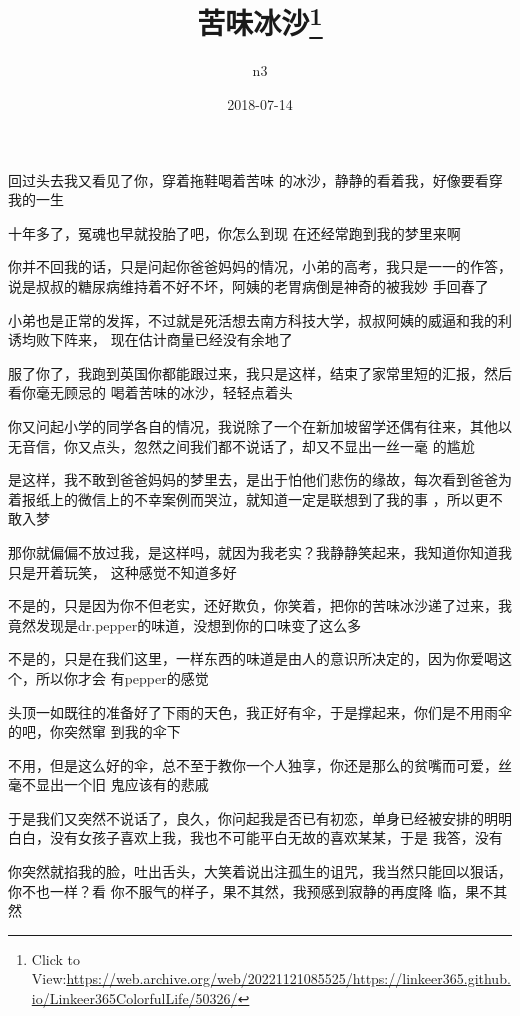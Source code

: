 \documentclass{article}
\title{苦味冰沙\footnote{Click to View:\url{https://web.archive.org/web/20221121085525/https://linkeer365.github.io/Linkeer365ColorfulLife/50326/}}}
\author{n3}
\date{2018-07-14}
\begin{document}

\maketitle


\Large

﻿回过头去我又看见了你，穿着拖鞋喝着苦味
的冰沙，静静的看着我，好像要看穿我的一生 

十年多了，冤魂也早就投胎了吧，你怎么到现
在还经常跑到我的梦里来啊 

你并不回我的话，只是问起你爸爸妈妈的情况，小弟的高考，我只是一一的作答，说是叔叔的糖尿病维持着不好不坏，阿姨的老胃病倒是神奇的被我妙
手回春了 

小弟也是正常的发挥，不过就是死活想去南方科技大学，叔叔阿姨的威逼和我的利诱均败下阵来，
现在估计商量已经没有余地了 

\newpage

服了你了，我跑到英国你都能跟过来，我只是这样，结束了家常里短的汇报，然后看你毫无顾忌的
喝着苦味的冰沙，轻轻点着头 

你又问起小学的同学各自的情况，我说除了一个在新加坡留学还偶有往来，其他以无音信，你又点头，忽然之间我们都不说话了，却又不显出一丝一毫
的尴尬 

是这样，我不敢到爸爸妈妈的梦里去，是出于怕他们悲伤的缘故，每次看到爸爸为着报纸上的微信上的不幸案例而哭泣，就知道一定是联想到了我的事
，所以更不敢入梦 

那你就偏偏不放过我，是这样吗，就因为我老实？我静静笑起来，我知道你知道我只是开着玩笑，
这种感觉不知道多好 

不是的，只是因为你不但老实，还好欺负，你笑着，把你的苦味冰沙递了过来，我竟然发现是dr.pepper的味道，没想到你的口味变了这么多
\newpage

 

不是的，只是在我们这里，一样东西的味道是由人的意识所决定的，因为你爱喝这个，所以你才会
有pepper的感觉 

头顶一如既往的准备好了下雨的天色，我正好有伞，于是撑起来，你们是不用雨伞的吧，你突然窜
到我的伞下 

不用，但是这么好的伞，总不至于教你一个人独享，你还是那么的贫嘴而可爱，丝毫不显出一个旧
鬼应该有的悲戚 

于是我们又突然不说话了，良久，你问起我是否已有初恋，单身已经被安排的明明白白，没有女孩子喜欢上我，我也不可能平白无故的喜欢某某，于是
我答，没有 

你突然就掐我的脸，吐出舌头，大笑着说出注孤生的诅咒，我当然只能回以狠话，你不也一样？看
\newpage
你不服气的样子，果不其然，我预感到寂静的再度降
临，果不其然 
\end{document}
